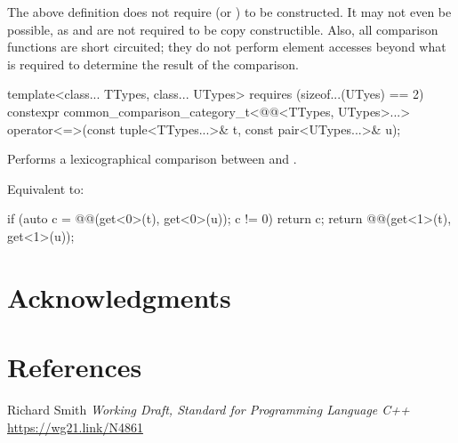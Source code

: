 \documentclass{wg21}
\begin{document}
\pnum
\begin{note}
    The above definition does not require 
    (or ) to be constructed. It may not
    even be possible, as  and  are not required to be copy
    constructible. Also, all comparison functions are short circuited;
    they do not perform element accesses beyond what is required to determine the
    result of the comparison.
\end{note}

\begin{addedblock}
\begin{itemdecl}
template<class... TTypes, class... UTypes>
requires (sizeof...(UTyes) == 2)
constexpr common_comparison_category_t<@@<TTypes, UTypes>...>
operator<=>(const tuple<TTypes...>& t, const pair<UTypes...>& u);
\end{itemdecl}

\begin{itemdescr}
    \pnum
    \effects
    Performs a lexicographical comparison between  and .
    
    Equivalent to:
    \begin{codeblock}
        if (auto c = @@(get<0>(t), get<0>(u)); c != 0)
            return c;
        return  @@(get<1>(t), get<1>(u));
    \end{codeblock}
\end{itemdescr}
\end{addedblock}



\section{Acknowledgments}


\section{References}
\renewcommand{\section}[2]{}%



\begin{thebibliography}{9}

    Richard Smith
    \emph{Working Draft, Standard for Programming Language C++}\newline
    \url{https://wg21.link/N4861}

\end{thebibliography}
\end{document}
